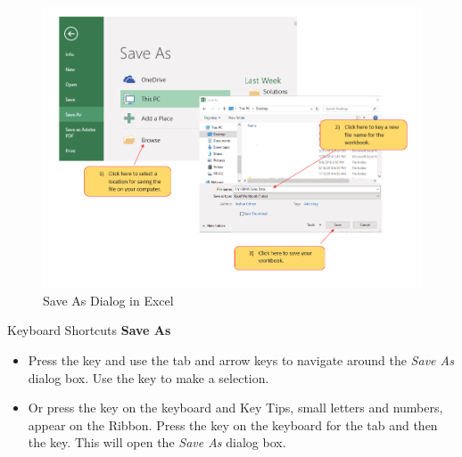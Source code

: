 \begin{figure}[H]
	\centering
	\includegraphics[width=\maxwidth{.95\linewidth}]{gfx/ch01_fig12}
	\caption{Save As Dialog in Excel}
	\label{01:fig12}
\end{figure}

\begin{center}
	\begin{shtcutbox}{Keyboard Shortcuts}
		\textbf{Save As}
		\\
		\begin{itemize}
			\setlength{\itemsep}{0pt}
			\setlength{\parskip}{0pt}
			\setlength{\parsep}{0pt}
			
			\item Press the  key and use the tab and arrow keys to navigate around the \textit{Save As} dialog box. Use the  key to make a selection.
			\item Or press the  key on the keyboard and Key Tips, small letters and numbers, appear on the Ribbon. Press the  key on the keyboard for the  tab and then the  key. This will open the \textit{Save As} dialog box.
			
		\end{itemize}
	\end{shtcutbox}
\end{center}

